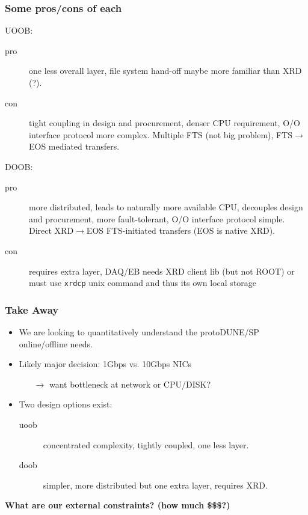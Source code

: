 \documentclass[xcolor=dvipsnames]{beamer}
\begin{document}
\begin{frame}
  \frametitle{Some pros/cons of each}

  UOOB:
  \begin{description}
  \item[pro] one less overall layer, file system hand-off maybe more
    familiar than XRD (?).
  \item[con] tight coupling in design and procurement, denser CPU
    requirement, O/O interface protocol more complex.  Multiple FTS
    (not big problem), FTS$\to$EOS mediated transfers.
  \end{description}

  DOOB:

  \begin{description}
  \item[pro] more distributed, leads to naturally more available CPU,
    decouples design and procurement, more fault-tolerant, O/O
    interface protocol simple.  Direct XRD$\to$EOS FTS-initiated
    transfers (EOS is native XRD).
  \item[con] requires extra layer, DAQ/EB needs XRD client lib (but not
    ROOT) or must use \texttt{xrdcp} unix command and thus its own
    local storage
  \end{description}
\end{frame}

\begin{frame}
  \frametitle{Take Away}
  \begin{itemize}
  \item We are looking to quantitatively understand the protoDUNE/SP
    online/offline needs.
  \item Likely major decision: 1Gbps vs. 10Gbps NICs
    \begin{itemize}
    \item[$\rightarrow$] want bottleneck at network or CPU/DISK?
    \end{itemize}
  \item Two design options exist:
    \begin{description}
    \item[uoob] concentrated complexity, tightly coupled, one less layer.
    \item[doob] simpler, more distributed but one extra layer, requires XRD.
    \end{description}
  \end{itemize}
  \textbf{What are our external constraints?  (how much \$\$\$?)}
\end{frame}
\end{document}
